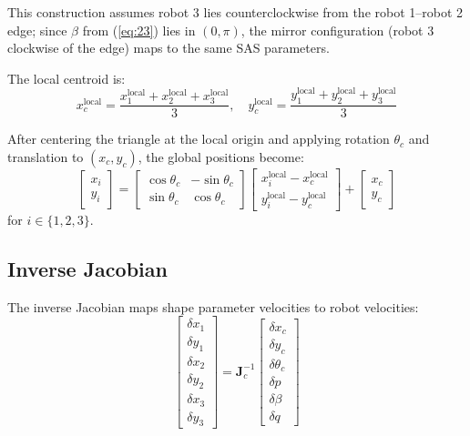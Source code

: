 \documentclass[lettersize,journal]{IEEEtran}
\begin{document}
This construction assumes robot 3 lies counterclockwise from the robot 1--robot 2 edge; since $\beta$ from (\ref{eq:23}) lies in $(0, \pi)$, the mirror configuration (robot 3 clockwise of the edge) maps to the same SAS parameters.

The local centroid is:
\begin{equation}\label{eq:28}
x_c^{\text{local}} = \frac{x_1^{\text{local}} + x_2^{\text{local}} + x_3^{\text{local}}}{3}, \quad y_c^{\text{local}} = \frac{y_1^{\text{local}} + y_2^{\text{local}} + y_3^{\text{local}}}{3}
\end{equation}

After centering the triangle at the local origin and applying rotation $\theta_c$ and translation to $(x_c, y_c)$, the global positions become:
\begin{equation}\label{eq:29}
\begin{bmatrix} x_i \\ y_i \end{bmatrix} = \begin{bmatrix} \cos\theta_c & -\sin\theta_c \\ \sin\theta_c & \cos\theta_c \end{bmatrix} \begin{bmatrix} x_i^{\text{local}} - x_c^{\text{local}} \\ y_i^{\text{local}} - y_c^{\text{local}} \end{bmatrix} + \begin{bmatrix} x_c \\ y_c \end{bmatrix}
\end{equation}
for $i \in \{1, 2, 3\}$.

\subsection{Inverse Jacobian}

The inverse Jacobian maps shape parameter velocities to robot velocities:
\begin{equation}\label{eq:30}
\begin{bmatrix}
\delta x_1 \\ \delta y_1 \\ \delta x_2 \\ \delta y_2 \\ \delta x_3 \\ \delta y_3
\end{bmatrix} =
\mathbf{J}_c^{-1}
\begin{bmatrix}
\delta x_c \\ \delta y_c \\ \delta \theta_c \\ \delta p \\ \delta \beta \\ \delta q
\end{bmatrix}
\end{equation}
\end{document}
